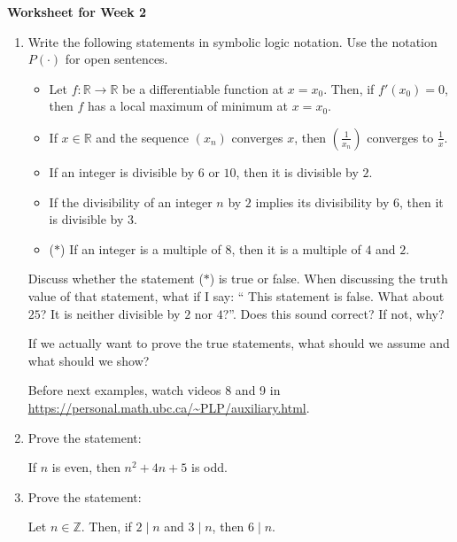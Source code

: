 \documentclass[12pt]{article}
\begin{document}
\centerline{\bf\large Worksheet for Week 2}

\vspace{25pt}


\begin{enumerate}

\item Write the following statements in symbolic logic notation. Use the notation $P(\cdot)$ for open sentences.

\begin{itemize}

\item {\color{red} Let $f:\mathbb R \to \mathbb R$ be a differentiable function at $x=x_0$. Then, if $f'(x_0)=0$, then $f$ has a local maximum of minimum at $x=x_0$}.

\item If $x\in\mathbb R$ and the sequence $(x_n)$ converges $x$, then $(\frac{1}{x_n})$ converges to $\frac{1}{x}$.

\item {\color{red} If an integer is divisible by $6$ or $10$, then it is divisible by $2$}.

\item If the divisibility of an integer $n$ by $2$ implies its divisibility by $6$, then it is divisible by $3$.

\item {\color{red}($\ast$) If an integer is a multiple of $8$, then it is a multiple of $4$ and $2$}.

\end{itemize}

Discuss whether the statement ($\ast$) is true or false. When discussing the truth value of that statement, what if I say: `` This statement is false. What about $25$? It is neither divisible by $2$ nor $4$?''. Does this sound correct? If not, why?

 If we actually want to prove the true statements, what should we assume and what should we show?
 
 Before next examples, watch videos 8 and 9 in \url{https://personal.math.ubc.ca/~PLP/auxiliary.html}.

\item  Prove the statement:
\begin{center}
If $n$ is even, then $n^2+4n+5$ is odd.
\end{center}


\item Prove the statement:
\begin{center}
Let $n\in\mathbb Z$. Then, if $2\mid n$ and $3\mid n$, then $6\mid n$.
\end{center}


\end{enumerate}
\end{document}
